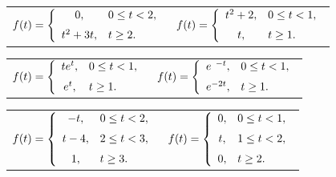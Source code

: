 \begin{exerciselist}

  \begin{tabular}[t]{@{}p{168pt}@{}p{168pt}}
    \item\label{exer:8.4.7}$\displaystyle{f(t)=\left\{\begin{array}{cl}0,&0\le t<2,\\[2\jot]t^{2}+3t,&t\ge2.\end{array}\right.}$ &
    \item\label{exer:8.4.8} $\displaystyle{f(t)=\left\{\begin{array}{cl}t^{2}+2,&0\le t<1,\\[2\jot]t,&t\ge1.\end{array}\right.}$
  \end{tabular}

  \begin{tabular}[t]{@{}p{168pt}@{}p{168pt}}
    \item\label{exer:8.4.9} $\displaystyle{f(t)=\left\{\begin{array}{cl}te^{t},&0\le t <1,\\[2\jot]e^{t},&t\ge1.\end{array}\right.}$ &
    \item\label{exer:8.4.10} $\displaystyle{f(t)=\left\{\begin{array}{cl}e^{\phantom{2}-t},&0\le t<1,\\[2\jot] e^{-2t},&t\ge1.\end{array}\right.}$
  \end{tabular}

  \begin{tabular}[t]{@{}p{168pt}@{}p{168pt}}
    \item\label{exer:8.4.11} $\displaystyle{f(t)=\left\{\begin{array}{cl}-t,&0\le t<2,\\[2\jot]t-4,&2\le t<3,\\[2\jot]1,&t\ge3.\end{array}\right.}$ &
    \item\label{exer:8.4.12} $\displaystyle{f(t)=\left\{\begin{array}{cl}0,&0\le t<1,\\[2\jot]t,&1\le t<2,\\[2\jot]0,&t\ge2.\end{array}\right.}$
  \end{tabular}


\end{exerciselist}
